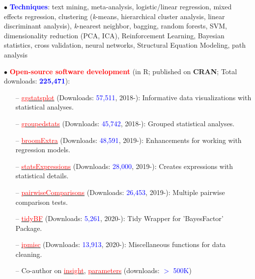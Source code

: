 \documentclass[10pt]{article}
\begin{document}
	$\bullet$ \textcolor{blue}{\textbf{Techniques}}: text mining, meta-analysis, logistic/linear regression, mixed effects regression, clustering \hspace*{0.1in}(\textit{k}-means, hierarchical cluster analysis, linear discriminant analysis), \textit{k}-nearest neighbor, bagging, random \hspace*{0.1in}forests, SVM, dimensionality reduction (PCA, ICA), Reinforcement Learning, Bayesian statistics, cross \hspace*{0.1in}validation, neural networks, Structural Equation Modeling, path analysis
	\miniskip
	
	$\bullet$ \textcolor{red}{\textbf{Open-source software development}} (in R; published on \textbf{CRAN}; Total downloads: \textcolor{blue}{\textbf{225,471}}):
	 \vspace*{-0.09in}
	 
	\begin{itemize}
	\itemsep-0.1em
	\item[--] \href{https://indrajeetpatil.github.io/ggstatsplot/}{\textcolor{red}{ggstatsplot}} (Downloads: \textcolor{blue}{57,511}, 2018-): Informative data visualizations with statistical analyses.
	\item[--] \href{https://indrajeetpatil.github.io/groupedstats/}{\textcolor{red}{groupedstats}} (Downloads: \textcolor{blue}{45,742}, 2018-): Grouped statistical analyses.
	\item[--] \href{https://indrajeetpatil.github.io/groupedstats/}{\textcolor{red}{broomExtra}} (Downloads: \textcolor{blue}{48,591}, 2019-): Enhancements for working with regression models.
	\item[--] \href{https://indrajeetpatil.github.io/statsExpressions/}{\textcolor{red}{statsExpressions}} (Downloads: \textcolor{blue}{28,000}, 2019-): Creates expressions with statistical details.
	\item[--] \href{https://indrajeetpatil.github.io/pairwiseComparisons/}{\textcolor{red}{pairwiseComparisons}} (Downloads: \textcolor{blue}{26,453}, 2019-): Multiple pairwise comparison tests.
    \item[--] \href{https://indrajeetpatil.github.io/tidyBF/}{\textcolor{red}{tidyBF}} (Downloads: \textcolor{blue}{5,261}, 2020-): Tidy Wrapper for 'BayesFactor' Package.
	\item[--] \href{https://indrajeetpatil.github.io/ipmisc/}{\textcolor{red}{ipmisc}} (Downloads: \textcolor{blue}{13,913}, 2020-): Miscellaneous functions for data cleaning.	
	\item[--] Co-author on \href{https://easystats.github.io/insight/}{\textcolor{red}{insight}}, \href{https://easystats.github.io/parameters/}{\textcolor{red}{parameters}} (downloads: \textcolor{blue}{$>$ 500K})
	\end{itemize}
	
\end{document}
